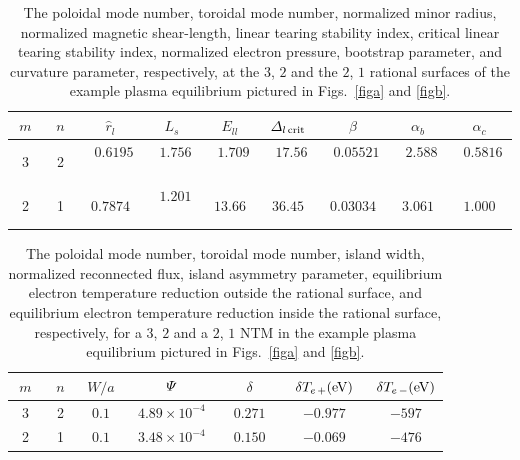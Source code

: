 \documentclass[12pt,prb,aps]{revtex4-1}
\begin{document}
\newpage
\begin{table}
\begin{tabular}{ccccccccc}
\hline
$m$ & $n$ & $\hat{r}_l$ & $L_s$ & $E_{ll}$ & ${\mit\Delta}_{l\,{\rm crit}}$ & $\hat{\beta}$ & $\alpha_b$ & $\alpha_c$\\[0.5ex]\hline
~3~&~2~ & ~$0.6195$~ & ~$1.756$~ & ~$1.709$~ & ~$17.56$~ & ~$0.05521$~ & ~$2.588$~ & ~$0.5816$~\\[0.5ex]
2& 1& $0.7874$  & ~$1.201$~&$ 13.66$ & $36.45$ & $0.03034$ & $3.061$ & $1.000$\\\hline
\end{tabular}
\caption{The poloidal mode number, toroidal mode number, normalized minor radius, normalized magnetic shear-length, linear tearing stability index, critical linear tearing stability index, normalized
electron pressure, bootstrap parameter, and curvature parameter, respectively, at the $3$, $2$ and the $2$, $1$ rational surfaces of the example
plasma equilibrium pictured in Figs.~\ref{figa} and \ref{figb}. \label{t1} }
\end{table}

\begin{table}
\begin{tabular}{ccccccc}
\hline
$m$ & $n$ & $W/a$ & ${\mit\Psi}$ & $\delta$ & ~$\delta T_{e\,+}({\rm eV})$~ & $\delta T_{e\,-}({\rm eV})$ \\[0.5ex]\hline
~3~&~2~ & ~$0.1$~ & ~$4.89\times 10^{-4}$~ & ~$0.271$~ & ~$-0.977$~ & ~$-597$~ \\[0.5ex]
2& 1& $0.1$  & ~$3.48\times 10^{-4}$~&$0.150$ & $-0.069$ & $-476$ \\\hline
\end{tabular}
\caption{The poloidal mode number, toroidal mode number, island width, normalized reconnected flux, island asymmetry parameter, equilibrium electron temperature reduction
outside the rational surface,  and equilibrium electron temperature reduction
inside the rational surface, respectively, for a $3$, $2$ and a $2$, $1$ NTM in the example
plasma equilibrium pictured in Figs.~\ref{figa} and \ref{figb}.  \label{t2} }
\end{table}
\end{document}
